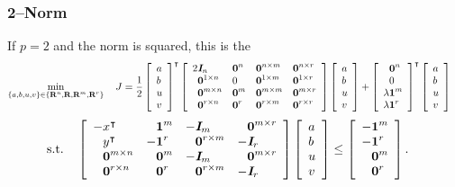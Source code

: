 \documentclass{article}
\begin{document}
    \subsubsection{2--Norm}

    If $p=2$ and the norm is squared, this is the \QP
    \begin{align*}
        \min_{\{a,b,u,v\}\in\{\textbf{R}^n,\textbf{R},\textbf{R}^m,\textbf{R}^r\}}  \quad J 
        & = \frac{1}{2}
            \left[\begin{array}{lllllllllllllllllll}
                a\\
                b\\
                u\\
                v
            \end{array}\right]^\intercal
        \left[\begin{array}{lllllllllllllllllll}
    2\emph{\textbf{I}}_n             & \textbf{0}^{n} & \textbf{0}^{n\times m} & \textbf{0}^{n\times r}\\
    \phantom{2}\textbf{0}^{1\times n} & 0                  & \textbf{0}^{1\times m} & \textbf{0}^{1\times r}\\
    \phantom{2}\textbf{0}^{m\times n} & \textbf{0}^{m} & \textbf{0}^{m\times m} & \textbf{0}^{m\times r}\\
    \phantom{2}\textbf{0}^{r\times n} & \textbf{0}^{r} & \textbf{0}^{r\times m} & \textbf{0}^{r\times r}
            \end{array}\right]
        \left[\begin{array}{lllllllllllllllllll}
            a\\
            b\\
            u\\
            v
        \end{array}\right]
        +\left[\begin{array}{lllllllllllllllllll}
            \phantom{\lambda}\textbf{0}^{n}\\
            \phantom{\lambda}0\\
            \lambda\textbf{1}^{m}\\
            \lambda\textbf{1}^{r}
        \end{array}\right]^\intercal
        \left[\begin{array}{lllllllllllllllllll}
            a\\
            b\\
            u\\
            v
        \end{array}\right]
    \end{align*}
    \begin{align*}
        \st\quad
        \mat{
                -x^\tp
            &
                \minus \ones^m
            &
                - \eye_m
            &   
                \minus \zeros^{m\times r}
            \\
                \minus y^\tp
            &
                -\ones^r
            &
                \minus \zeros^{r\times m}
            &
                - \eye_r
            \\
                \minus \zeros^{m\times n} & \minus \zeros^m & -\eye_m & \minus \zeros^{m\times r} 
                \\
                \minus \zeros^{r\times n} & \minus \zeros^r & \minus \zeros^{r\times m} & -\eye_r 
            }
        &\mat{a \\ b \\ u \\ v}
        \leq
        \mat{ -\ones^m \\ -\ones^r \\ \minus \zeros^m \\ \minus \zeros^r}.
    \end{align*}
\end{document}
